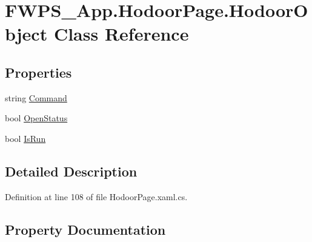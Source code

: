 \hypertarget{class_f_w_p_s___app_1_1_hodoor_page_1_1_hodoor_object}{}\section{F\+W\+P\+S\+\_\+\+App.\+Hodoor\+Page.\+Hodoor\+Object Class Reference}
\label{class_f_w_p_s___app_1_1_hodoor_page_1_1_hodoor_object}
\subsection*{Properties}
\begin{DoxyCompactItemize}
\item 
string \mbox{\hyperlink{class_f_w_p_s___app_1_1_hodoor_page_1_1_hodoor_object_ad7fe083619cd544450c7bcca5ca7c773}{Command}}
\item 
bool \mbox{\hyperlink{class_f_w_p_s___app_1_1_hodoor_page_1_1_hodoor_object_ac88da15b7efefcf3a5d32752df1d4d6f}{Open\+Status}}
\item 
bool \mbox{\hyperlink{class_f_w_p_s___app_1_1_hodoor_page_1_1_hodoor_object_a5fc47b9df18d98bcb81dba8b3047a9ad}{Is\+Run}}
\end{DoxyCompactItemize}


\subsection{Detailed Description}


Definition at line 108 of file Hodoor\+Page.\+xaml.\+cs.



\subsection{Property Documentation}
\mbox{\label{class_f_w_p_s___app_1_1_hodoor_page_1_1_hodoor_object_ad7fe083619cd544450c7bcca5ca7c773}} 
